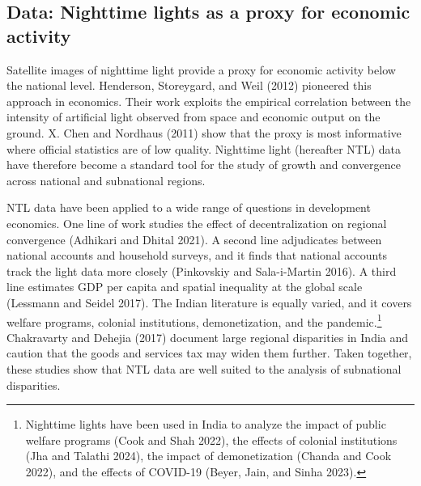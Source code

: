 \documentclass[
  letterpaper,
  DIV=11,
  numbers=noendperiod]{scrartcl}
\begin{document}
\subsection{Data: Nighttime lights as a proxy for economic
activity}\label{data-nighttime-lights-as-a-proxy-for-economic-activity}

Satellite images of nighttime light provide a proxy for economic
activity below the national level. Henderson, Storeygard, and Weil
(2012) pioneered this approach in economics. Their work exploits the
empirical correlation between the intensity of artificial light observed
from space and economic output on the ground. X. Chen and Nordhaus
(2011) show that the proxy is most informative where official statistics
are of low quality. Nighttime light (hereafter NTL) data have therefore
become a standard tool for the study of growth and convergence across
national and subnational regions.

NTL data have been applied to a wide range of questions in development
economics. One line of work studies the effect of decentralization on
regional convergence (Adhikari and Dhital 2021). A second line
adjudicates between national accounts and household surveys, and it
finds that national accounts track the light data more closely
(Pinkovskiy and Sala-i-Martin 2016). A third line estimates GDP per
capita and spatial inequality at the global scale (Lessmann and Seidel
2017). The Indian literature is equally varied, and it covers welfare
programs, colonial institutions, demonetization, and the
pandemic.\footnote{Nighttime lights have been used in India to analyze
  the impact of public welfare programs (Cook and Shah 2022), the
  effects of colonial institutions (Jha and Talathi 2024), the impact of
  demonetization (Chanda and Cook 2022), and the effects of COVID-19
  (Beyer, Jain, and Sinha 2023).} Chakravarty and Dehejia (2017)
document large regional disparities in India and caution that the goods
and services tax may widen them further. Taken together, these studies
show that NTL data are well suited to the analysis of subnational
disparities.
\end{document}
